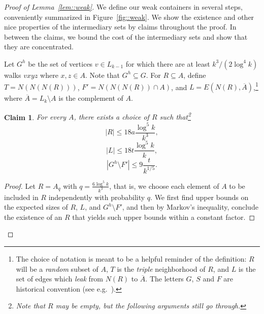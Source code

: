 \documentclass[12pt]{article}
\renewcommand{\bar}[1]{\overline{#1}}
\newtheorem{claim}[theorem]{Claim}
\begin{document}
\begin{proof}[Proof of Lemma~\ref{lem::weak}]
We define our weak containers in several steps, conveniently summarized in Figure~\ref{fig::weak}. We show the existence and other nice properties of the intermediary sets by claims throughout the proof. In between the claims, we bound the cost of the intermediary sets and show that they are concentrated.

Let $G^h$ be the set of vertices $v \in L_{k-1}$ for which there are at least $k^3/(2\log^4 k)$ walks $vxyz$ where $x,z \in A$. Note that $G^h \subseteq G$. For $R \subseteq A$, define $T = N(N(N(R)))$, $F' = N(N(N(R)) \cap A)$, and $L = E(N(R), \bar A)$,\footnote{The choice of notation is meant to be a helpful reminder of the definition: $R$ will be a \emph{random} subset of $A$, $T$ is the \emph{triple} neighborhood of $R$, and $L$ is the set of edges which \emph{leak} from $N(R)$ to $\bar A$. The letters $G$, $S$ and $F$ are historical convention (see e.g.~\cite{Galvin}).} where $\bar{A} = L_k \setminus A$ is the complement of $A$.

\begin{claim}
For every $A$, there exists a choice of $R$ such that\footnote{Note that $R$ may be empty, but the following arguments still go through.}
\begin{equation}\label{eq::R}
|R| \leq 18 a \frac{\log^5 k}{k^3} ,
\end{equation}
\begin{equation}\label{eq::L}
|L| \leq 18 t \frac{\log^5 k}{k} ,
\end{equation}
\begin{equation}\label{eq::Gh-F'}
|G^h \setminus F'| \leq 9\frac{t}{k^{1/5}} .
\end{equation} 
\end{claim}

\begin{proof}
Let $R = A_q$ with $q = \frac{6\log^5 k}{k^3}$, that is, we choose each element of $A$ to be included in $R$ independently with probability $q$. We first find upper bounds on the expected sizes of $R$, $L$, and $G^h \setminus F'$, and then by Markov's inequality, conclude the existence of an $R$ that yields such upper bounds within a constant factor.


\end{proof}
\end{proof}
\end{document}
